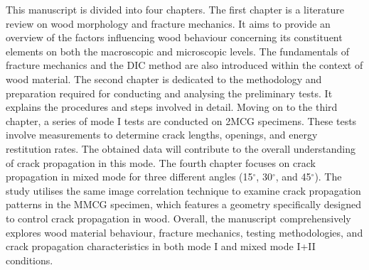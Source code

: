 This manuscript is divided into four chapters. The first chapter is a literature review on wood morphology and fracture mechanics. It aims to provide an overview of the factors influencing wood behaviour concerning its constituent elements on both the macroscopic and microscopic levels. The fundamentals of fracture mechanics and the DIC method are also introduced within the context of wood material.
The second chapter is dedicated to the methodology and preparation required for conducting and analysing the preliminary tests. It explains the procedures and steps involved in detail.
Moving on to the third chapter, a series of mode I tests are conducted on 2MCG specimens. These tests involve measurements to determine crack lengths, openings, and energy restitution rates. The obtained data will contribute to the overall understanding of crack propagation in this mode.
The fourth chapter focuses on crack propagation in mixed mode for three different angles (15$^\circ$, 30$^\circ$, and 45$^\circ$). The study utilises the same image correlation technique to examine crack propagation patterns in the MMCG specimen, which features a geometry specifically designed to control crack propagation in wood.
Overall, the manuscript comprehensively explores wood material behaviour, fracture mechanics, testing methodologies, and crack propagation characteristics in both mode I and mixed mode I+II conditions.

